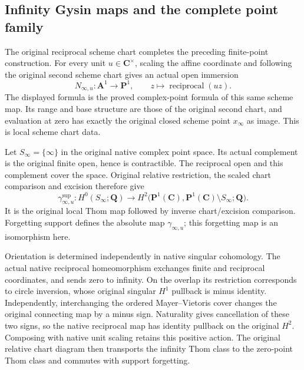 \documentclass[11pt]{article}
\theoremstyle{definition}
\theoremstyle{remark}
\newcommand{\Q}{\mathbf Q}
\begin{document}
\subsection{Infinity Gysin maps and the complete point family}
\label{subsec:p1-infinity-gysin}

The original reciprocal scheme chart completes the preceding finite-point
construction. For every unit \(u\in\mathbf C^\times\), scaling the
affine coordinate and following the original second scheme chart gives
an actual open immersion
\[
 N_{\infty,u}:\mathbf A^1\longrightarrow\mathbf P^1,
 \qquad z\longmapsto\operatorname{reciprocal}(uz).
\]
The displayed formula is the proved complex-point formula of this same
scheme map. Its range and base structure are those of the original
second chart, and evaluation at zero has exactly the original closed
scheme point \(x_\infty\) as image. This is local scheme chart data.

Let \(S_\infty=\{\infty\}\) in the original native complex point
space. Its actual complement is the original finite open, hence is
contractible. The reciprocal open and this complement cover the space.
Original relative restriction, the scaled chart comparison and excision
therefore give
\[
 \gamma^{\mathrm{sup}}_{\infty,u}:H^0(S_\infty;\Q)
 \longrightarrow
 H^2\bigl(\mathbf P^1(\mathbf C),
              \mathbf P^1(\mathbf C)\setminus S_\infty;\Q\bigr).
\]
It is the original local Thom map followed by inverse chart/excision
comparison. Forgetting support defines the absolute map
\(\gamma_{\infty,u}\); this forgetting map is an isomorphism here.

Orientation is determined independently in native singular cohomology.
The actual native reciprocal homeomorphism exchanges finite and
reciprocal coordinates, and sends zero to infinity. On the overlap its
restriction corresponds to circle inversion, whose original singular
\(H^1\) pullback is minus identity. Independently, interchanging the
ordered Mayer--Vietoris cover changes the original connecting map by a
minus sign. Naturality gives cancellation of these two signs, so the
native reciprocal map has identity pullback on the original \(H^2\).
Composing with native unit scaling retains this positive action. The
original relative chart diagram then transports the infinity Thom class
to the zero-point Thom class and commutes with support forgetting.
\end{document}
